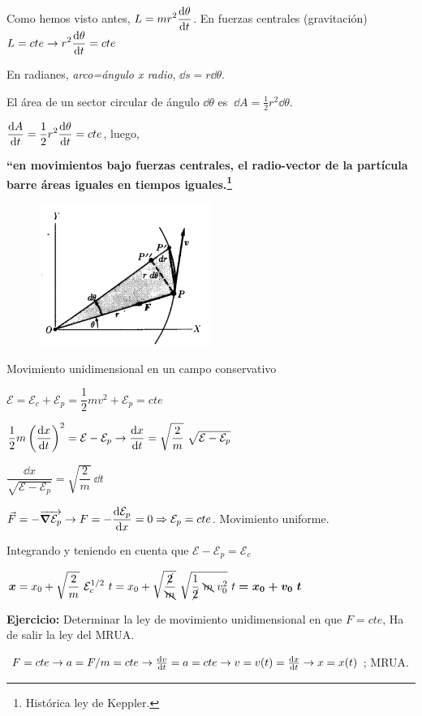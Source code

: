 \begin{ejem} Como hemos visto antes, $L=\displaystyle m r^2 \dv{\theta}{t}$. En fuerzas centrales (gravitación) $\displaystyle L=cte \to r^2 \dv{\theta}{t}=cte$

\begin{multicols}{2}
En radianes, \emph{arco=ángulo x radio}, $\dd s = r \dd \theta$.

El área de un sector circular de ángulo $\dd \theta$ es $\ \dd A= \frac 1 2 r^2 \dd \theta$. 

$\displaystyle \dv{A}{t}=\frac 1 2 r^2 \dv{\theta}{t}=cte$, luego,

 \textbf{``en movimientos bajo fuerzas centrales, el radio-vector de la partícula barre áreas iguales en tiempos iguales.\footnote{Histórica ley de Keppler.}}
\begin{figure}[H]
	\centering
	\includegraphics[width=0.5\textwidth]{imagenes/imagenes04/T04IM21.png}
\end{figure}
\end{multicols}
\end{ejem}



\begin{ejem}{Movimiento unidimensional en un campo conservativo}
	
$\mathcal E=\mathcal E_c+\mathcal E_p=\dfrac 1 2 m v^2 + \mathcal E_p=cte$

$\dfrac 1 2 m \displaystyle \left( \dv{x}{t} \right)^2 = \mathcal E-\mathcal E_p \to \dv{x}{t}=\sqrt{\dfrac 2 m} \ \sqrt{\mathcal E-\mathcal E_p}$

$\displaystyle \dfrac {\dd x}{\sqrt{\mathcal E-\mathcal E_p}}=\sqrt{\dfrac 2 m} \ \dd t$

 $\displaystyle \vec F=-\overrightarrow{ \grad{\mathcal E_p}}\to F=-\dv{\mathcal E_p}{x}=0 \Rightarrow \mathcal E_p=cte $. Movimiento uniforme.
 
 Integrando y teniendo en cuenta que $\mathcal E-\mathcal E_p=\mathcal E_c$
 
 $\displaystyle \boldsymbol{ x}=x_0+ \sqrt{\dfrac 2 m}\ \mathcal E_c^{1/2} \ t=
 x_0 + \sqrt{\dfrac {\cancel{2}}{\bcancel{m}}} \ \sqrt{\dfrac 1 {\cancel{2}} \ \bcancel{m} \ v_0^2} \ t \boldsymbol{ = x_0+v_0\ t}$
 
 \textbf{Ejercicio:} Determinar la ley de movimiento unidimensional en que $F=cte$, Ha de salir la ley del MRUA.	
 \end{ejem}
\footnotesize{\textcolor{gris}{$F=cte \to a=F/m=cte \to \dv{v}{t}=a=cte \to v=v(t)=\dv{x}{t}\to  x=x(t)$; MRUA}}\normalsize{.}



